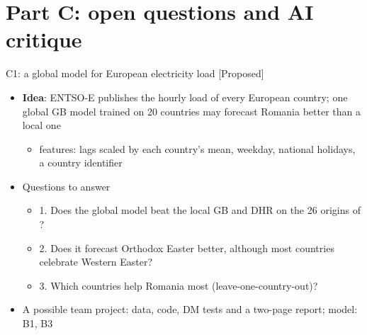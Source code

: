 \section{Part C: open questions and AI critique}

\begin{frame}{C1: a global model for European electricity load [Proposed]}
\itemsize{\footnotesize}
\begin{itemize}
    \item \textbf{Idea}: ENTSO-E publishes the hourly load of every European country; one global GB model trained on 20 countries may forecast Romania better than a local one
    \begin{itemize}
        \item features: lags scaled by each country's mean, weekday, national holidays, a country identifier
    \end{itemize}
    \item Questions to answer
    \begin{itemize}
        \item 1. Does the global model beat the local GB and DHR on the 26 origins of ?
        \item 2. Does it forecast Orthodox Easter better, although most countries celebrate Western Easter?
        \item 3. Which countries help Romania most (leave-one-country-out)?
    \end{itemize}
    \item A possible team project: data, code, DM tests and a two-page report; model: B1, B3
\end{itemize}
\end{frame}

